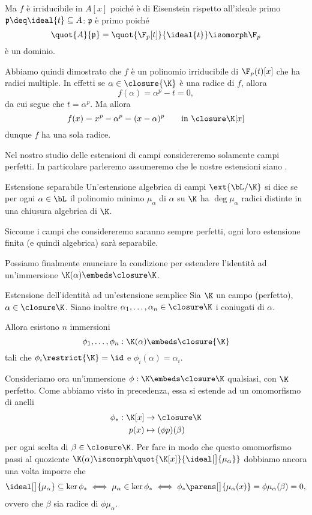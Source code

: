 Ma $f$ è irriducibile in $A[x]$ poiché è di Eisenstein rispetto all'ideale primo $\mathfrak{p} \deq \ideal{t} \subseteq A$: $\mathfrak{p}$ è primo poiché \[
    \quot{A}{\mathfrak{p}} = \quot{\F_p[t]}{\ideal{t}} \isomorph \F_p
\] è un dominio.

Abbiamo quindi dimostrato che $f$ è un polinomio irriducibile di $\F_p(t)[x]$ che ha radici multiple. In effetti se $\alpha \in \closure{\K}$ è una radice di $f$, allora \[
    f(\alpha) = \alpha^p - t = 0,
\] da cui segue che $t = \alpha^p$. Ma allora \[
    f(x) = x^p - \alpha^p = (x - \alpha)^p \qquad \text{in } \closure\K[x]
\] dunque $f$ ha una sola radice.

Nel nostro studio delle estensioni di campi considereremo solamente campi perfetti. In particolare parleremo assumeremo che le nostre estensioni siano .

\begin{definition}
    {Estensione separabile}{}
    Un'estensione algebrica di campi $\ext{\bL / \K}$ si dice  se per ogni $\alpha \in \bL$ il polinomio minimo $\mu_\alpha$ di $\alpha$ su $\K$ ha $\deg \mu_\alpha$ radici distinte in una chiusura algebrica di $\K$.  
\end{definition}

Siccome i campi che considereremo saranno sempre perfetti, ogni loro estensione finita (e quindi algebrica) sarà separabile.

Possiamo finalmente enunciare la condizione per estendere l'identità ad un'immersione $\K(\alpha) \embeds \closure\K$.

\begin{theorem}
    {Estensione dell'identità ad un'estensione semplice}{}
    Sia $\K$ un campo (perfetto), $\alpha \in \closure\K$. Siano inoltre $\alpha_1, \dots, \alpha_n \in \closure\K$ i coniugati di $\alpha$. 

    Allora esistono $n$ immersioni \[
        \phi_1, \dots, \phi_n : \K(\alpha) \embeds \closure{\K}
    \] tali che $\phi_i\restrict{\K} = \id$ e $\phi_i(\alpha) = \alpha_i$. 
\end{theorem} 

Consideriamo ora un'immersione $\phi : \K \embeds \closure\K$ qualsiasi, con $\K$ perfetto. Come abbiamo visto in precedenza, essa si estende ad un omomorfismo di anelli \begin{align*}
    \phi_\ast : \K[x] &\to \closure\K \\
    p(x) &\mapsto (\phi p)(\beta)
\end{align*} per ogni scelta di $\beta \in \closure\K$. Per fare in modo che questo omomorfismo passi al quoziente $\K(\alpha) \isomorph \quot{\K[x]}{\ideal[\big]{\mu_\alpha}}$ dobbiamo ancora una volta imporre che \begin{equation*}
    \ideal[\big]{\mu_\alpha} \subseteq \ker \phi_\ast
    \iff \mu_\alpha \in \ker \phi_\ast
    \iff \phi_\ast\parens[\big]{\mu_\alpha(x)} = \phi\mu_\alpha(\beta) = 0,
\end{equation*} ovvero che $\beta$ sia radice di $\phi\mu_\alpha$.

